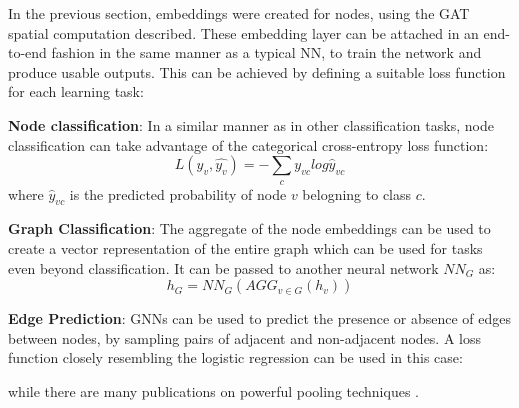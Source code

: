 In the previous section, embeddings were created for nodes, using the
GAT spatial computation described. These embedding layer can be attached
in an end-to-end fashion in the same manner as a typical NN, to train the
network and produce usable outputs. This can be achieved by defining a suitable
loss function for each learning task:

\textbf{Node classification}: In a similar manner as in other classification
tasks, node classification can take advantage of the categorical cross-entropy loss
function:
\begin{equation}
  \label{eq:categoricalCE}
  L(y_v,\hat{y_v}) = - \sum_c y_{vc} log\hat{y}_{vc}
\end{equation}
where $\hat{y}_{vc}$ is the predicted probability of node $v$ belogning to class $c$.

\textbf{Graph Classification}: The aggregate of the node embeddings can be
used to create a vector representation of the entire graph which can be used
for tasks even beyond classification. It can be passed to another neural
network $NN_G$ as:
\begin{equation*}
  h_G = NN_G(AGG_{v\in G}({h_v}))
\end{equation*}

\textbf{Edge Prediction}: GNNs can be used to predict the presence or absence of
edges between nodes, by sampling pairs of adjacent and non-adjacent nodes. A loss
function closely resembling the logistic regression can be used in this case:

while there are many publications on powerful pooling techniques \cite{zhang2018end,ying2018hierarchical,lee2019self}.